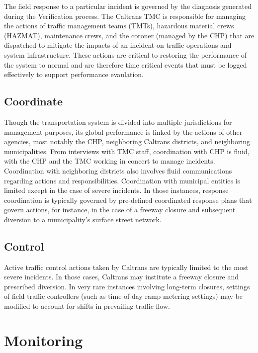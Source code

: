 \documentclass[12pt]{report}
\begin{document}
The field response to a particular incident is governed by the diagnosis
generated during the {\sc Verification} process.  The Caltrans TMC is
responsible for managing the actions of traffic management teams (TMTs),
hazardous material crews (HAZMAT), maintenance crews, and the coroner (managed
by the CHP) that are dispatched to mitigate the impacts of an incident on
traffic operations and system infrastructure.  These actions are critical to
restoring the performance of the system to normal and are therefore time
critical events that must be logged effectively to support performance
evaulation.

\subsection{Coordinate}
\label{sec:coordinate}

Though the transportation system is divided into multiple jurisdictions for
management purposes, its global performance is linked by the actions of other
agencies, most notably the CHP, neighboring Caltrans districts, and neighboring
municipalities.  From interviews with TMC staff, coordination with CHP is fluid,
with the CHP and the TMC working in concert to manage incidents.  Coordination
with neighboring districts also involves fluid communications regarding actions
and responsibilities.  Coordination with municipal entities is limited except in
the case of severe incidents.  In those instances, response coordination is
typically governed by pre-defined coordinated response plans that govern
actions, for instance, in the case of a freeway closure and subsequent diversion
to a municipality's surface street network.


\subsection{Control}
\label{sec:control}

Active traffic control actions taken by Caltrans are typically limited to the
most severe incidents.  In those cases, Caltrans may institute a freeway closure
and prescribed diversion.  In very rare instances involving long-term closures,
settings of field traffic controllers (such as time-of-day ramp metering
settings) may be modified to account for shifts in prevailing traffic flow.


\section{Monitoring}
\label{sec:monitoring}
\end{document}
